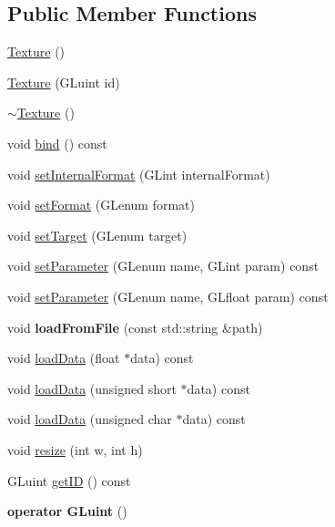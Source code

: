 \subsection*{Public Member Functions}
\begin{DoxyCompactItemize}
\item 
\hyperlink{class_texture_a6c275e3f186675ff6ed73ccf970e552f}{Texture} ()
\item 
\hyperlink{class_texture_af0e04d16bacfbc9d1e52425efba4d898}{Texture} (G\+Luint id)
\item 
\hyperlink{class_texture_a09c4bcb7462f64c1d20fa69dba3cee8a}{$\sim$\+Texture} ()
\item 
void \hyperlink{class_texture_a49f3f1d6ec4370accdd9f007bb8934a5}{bind} () const 
\item 
void \hyperlink{class_texture_a0077a1cdcaf1c13e63f8f77f4894a84a}{set\+Internal\+Format} (G\+Lint internal\+Format)
\item 
void \hyperlink{class_texture_a7371169b17e32f6964af586ca6df2ff9}{set\+Format} (G\+Lenum format)
\item 
void \hyperlink{class_texture_a6819dd6a1070f0984d0c1f3c4ac47b22}{set\+Target} (G\+Lenum target)
\item 
void \hyperlink{class_texture_acd393734de22cd6e9f509f9ed41df8c0}{set\+Parameter} (G\+Lenum name, G\+Lint param) const 
\item 
void \hyperlink{class_texture_ab313b1279fda778b9575775f11392fcc}{set\+Parameter} (G\+Lenum name, G\+Lfloat param) const 
\item 
\hypertarget{class_texture_ac87726651e36811e1a46a0672d8a78a8}{}void {\bfseries load\+From\+File} (const std\+::string \&path)\label{class_texture_ac87726651e36811e1a46a0672d8a78a8}

\item 
void \hyperlink{class_texture_a7dbb3df1197eb229899158a128306d58}{load\+Data} (float $\ast$data) const 
\item 
void \hyperlink{class_texture_a11d626cb2c9fc19ed4946499832bce6c}{load\+Data} (unsigned short $\ast$data) const 
\item 
void \hyperlink{class_texture_a13edfe27037666e4fa7eeead51b29374}{load\+Data} (unsigned char $\ast$data) const 
\item 
void \hyperlink{class_texture_a61b781eed5eba214c0957df09b81fef1}{resize} (int w, int h)
\item 
G\+Luint \hyperlink{class_texture_a2b8ae08dd8da13a82e5fba4e9d691d1c}{get\+I\+D} () const 
\item 
\hypertarget{class_texture_a464c8e0de6328cd069de0c74c1bc8c60}{}{\bfseries operator G\+Luint} ()\label{class_texture_a464c8e0de6328cd069de0c74c1bc8c60}

\end{DoxyCompactItemize}
